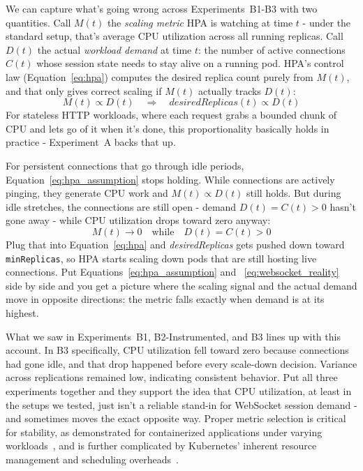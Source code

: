 \documentclass[twocolumn]{svjour3}
\begin{document}
We can capture what's going wrong across Experiments~B1-B3 with two quantities.
Call $M(t)$ the \textit{scaling metric} HPA is watching at time $t$ - under the
standard setup, that's average CPU utilization across all running replicas. Call
$D(t)$ the actual \textit{workload demand} at time $t$: the number of active
connections $C(t)$ whose session state needs to stay alive on a running pod. HPA's
control law (Equation~\ref{eq:hpa}) computes the desired replica count purely from
$M(t)$, and that only gives correct scaling if $M(t)$ actually tracks $D(t)$:
\begin{equation}
M(t) \propto D(t) \quad \Longrightarrow \quad
\textit{desiredReplicas}(t) \propto D(t)
\label{eq:hpa_assumption}
\end{equation}
For stateless HTTP workloads, where each request grabs a bounded chunk of CPU and
lets go of it when it's done, this proportionality basically holds in practice -
Experiment~A backs that up.

For persistent connections that go through idle periods, Equation~\ref{eq:hpa_assumption}
stops holding. While connections are actively pinging, they generate CPU work and
$M(t) \propto D(t)$ still holds. But during idle stretches, the connections are
still open - demand $D(t) = C(t) > 0$ hasn't gone away - while CPU utilization
drops toward zero anyway:
\begin{equation}
M(t) \to 0 \quad \text{while} \quad D(t) = C(t) > 0
\label{eq:websocket_reality}
\end{equation}
Plug that into Equation~\ref{eq:hpa} and \textit{desiredReplicas} gets pushed down
toward \texttt{minReplicas}, so HPA starts scaling down pods that are still hosting
live connections. Put Equations~\ref{eq:hpa_assumption} and
~\ref{eq:websocket_reality} side by side and you get a picture where the scaling
signal and the actual demand move in opposite directions: the metric falls exactly
when demand is at its highest.

What we saw in Experiments~B1, B2-Instrumented, and B3 lines up with this account.
In B3 specifically, CPU utilization fell toward zero because connections had gone
idle, and that drop happened before every scale-down decision. Variance across replications remained low, indicating consistent behavior. Put all three
experiments together and they support the idea that CPU utilization, at least in
the setups we tested, just isn't a reliable stand-in for WebSocket session demand
- and sometimes moves the exact opposite way. Proper metric selection is critical for stability, as demonstrated for containerized applications under varying workloads~\cite{casalicchio2019performance}, and is further complicated by Kubernetes' inherent resource management and scheduling overheads~\cite{medel2024characterising}.
\end{document}
